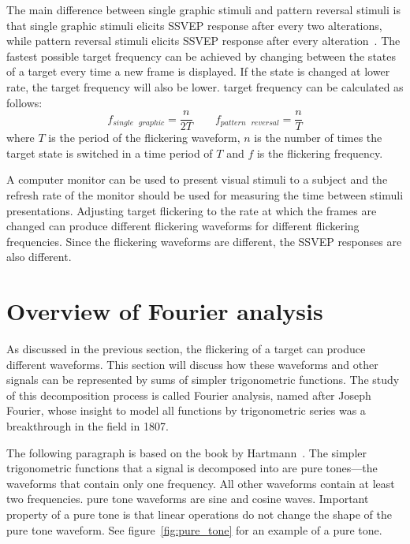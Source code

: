 The main difference between \gls{single graphic} stimuli and \gls{pattern reversal} stimuli is that \gls{single graphic} stimuli elicits \gls{SSVEP} response after every two alterations, while \gls{pattern reversal} stimuli elicits \gls{SSVEP} response after every alteration~\cite{ssvep_stim}. The fastest possible target frequency can be achieved by changing between the \glspl{state} of a target every time a new \gls{frame} is displayed. If the \gls{state} is changed at lower rate, the \gls{target} frequency will also be lower. \Gls{target} frequency can be calculated as follows:
\begin{equation}
	f_{single\mbox{ }graphic} = \frac{n}{2T} \qquad f_{pattern\mbox{ }reversal} = \frac{n}{T}
\end{equation}
where $T$ is the period of the \gls{flickering waveform}, $n$ is the number of times the \gls{target} \gls{state} is switched in a time period of $T$ and $f$ is the \gls{flickering} frequency.

A computer monitor can be used to present visual stimuli to a subject and the \gls{refresh rate} of the monitor should be used for measuring the time between stimuli presentations. Adjusting \gls{target} \gls{flickering} to the rate at which the \glspl{frame} are changed can produce different \glspl{flickering waveform} for different \gls{flickering} frequencies. Since the \glspl{flickering waveform} are different, the \gls{SSVEP} responses are also different.

\section{Overview of Fourier analysis}
\label{sec:fourier}

As discussed in the previous section, the \gls{flickering} of a \gls{target} can produce different waveforms. This section will discuss how these waveforms and other signals can be represented by sums of simpler trigonometric functions. The study of this decomposition process is called Fourier analysis, named after Joseph Fourier, whose insight to model all functions by trigonometric series was a breakthrough in the field in 1807.

The following paragraph is based on the book by Hartmann~\cite{pure_tone}. The simpler trigonometric functions that a signal is decomposed into are \glspl{pure tone}---the waveforms that contain only one frequency. All other waveforms contain at least two frequencies. \Gls{pure tone} waveforms are sine and cosine waves. Important property of a \gls{pure tone} is that linear operations do not change the shape of the \gls{pure tone} waveform. See figure~\ref{fig:pure_tone} for an example of a \gls{pure tone}.

